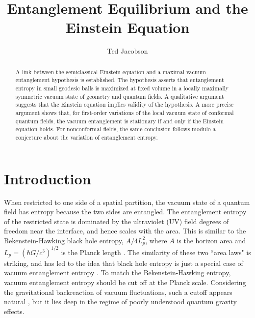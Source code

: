 \documentclass[aps,prd,twocolumn,showpacs,groupedaddress,nofootinbib,longbibliography]{revtex4-1}
\begin{document}
\title{Entanglement Equilibrium and the Einstein Equation}

\author{Ted Jacobson}



\begin{abstract}

A link between the semiclassical Einstein equation and a maximal vacuum entanglement hypothesis is established. The hypothesis asserts that entanglement entropy in small geodesic balls is maximized at fixed volume in a locally maximally symmetric vacuum state of geometry and quantum fields. A qualitative argument suggests that the Einstein equation implies validity of the hypothesis. A more precise argument shows that, for first-order  variations of the local vacuum state of conformal quantum fields, the vacuum entanglement is stationary if and only if the Einstein equation holds. For nonconformal fields, the same conclusion follows modulo a conjecture about the variation of entanglement entropy.
\end{abstract}

\maketitle

\section{Introduction}

When restricted to one side of a spatial partition, the vacuum state of a quantum field has entropy because the two sides are entangled. The entanglement entropy of the restricted state is dominated by the ultraviolet (UV) field degrees of freedom near the interface, and hence scales with the area. This is similar to the Bekenstein-Hawking black hole entropy, $A/4L_p^2$, where $A$ is the horizon area and  $L_p = (\hbar G/c^3)^{1/2}$ is the Planck length  \cite{Bekenstein1972,Bekenstein1973,Hawking1974}. The similarity of these two ``area laws" is striking, and has led to the idea that black hole entropy is just a special case of vacuum entanglement entropy \cite{Sorkin1983,'tHooft1984,Bombellietal1986,FrolovNovikov1993,Srednicki1993,Solodukhin:2011gn}.
To match the Bekenstein-Hawking entropy, vacuum entanglement entropy should be cut off at the Planck scale.
Considering the gravitational backreaction of vacuum fluctuations, such a cutoff appears natural \cite{FrolovNovikov1993,Jacobson:2012yt}, but it lies deep in the regime of poorly understood quantum gravity effects. 
\end{document}
